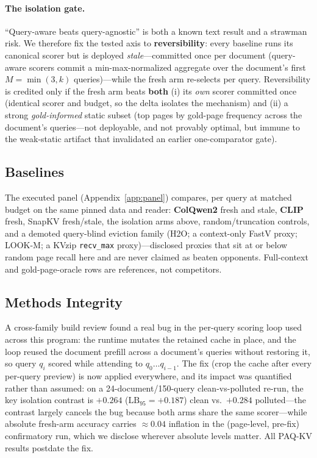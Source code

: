 \documentclass[letterpaper]{article} %
\newcommand{\paqc}{\textsc{PAQ-KV}}
\newcommand{\lb}{\mathrm{LB}_{95}}
\begin{document}
\paragraph{The isolation gate.} ``Query-aware beats query-agnostic'' is both a known text result \citep{tang2024quest} and a strawman risk. We therefore fix the tested axis to \textbf{reversibility}: every baseline runs its canonical scorer but is deployed \emph{stale}---committed once per document (query-aware scorers commit a min-max-normalized aggregate over the document's first $M=\min(3,k)$ queries)---while the fresh arm re-selects per query. Reversibility is credited only if the fresh arm beats \textbf{both} (i) its \emph{own} scorer committed once (identical scorer and budget, so the delta isolates the mechanism) and (ii) a strong \emph{gold-informed} static subset (top pages by gold-page frequency across the document's queries---not deployable, and not provably optimal, but immune to the weak-static artifact that invalidated an earlier one-comparator gate).

\subsection{Baselines}
The executed panel (Appendix~\ref{app:panel}) compares, per query at matched budget on the same pinned data and reader: \textbf{ColQwen2} \citep{faysse2025colpali} fresh and stale, \textbf{CLIP} \citep{radford2021clip} fresh, SnapKV fresh/stale, the isolation arms above, random/truncation controls, and a demoted query-blind eviction family (H2O; a context-only FastV proxy; LOOK-M; a KVzip \texttt{recv\_max} proxy)---disclosed proxies that sit at or below random page recall here and are never claimed as beaten opponents. Full-context and gold-page-oracle rows are references, not competitors.

\subsection{Methods Integrity}\label{sec:integrity}
A cross-family build review found a real bug in the per-query scoring loop used across this program: the runtime mutates the retained cache in place, and the loop reused the document prefill across a document's queries without restoring it, so query $q_i$ scored while attending to $q_0\ldots q_{i-1}$. The fix (crop the cache after every per-query preview) is now applied everywhere, and its impact was quantified rather than assumed: on a 24-document/150-query clean-vs-polluted re-run, the key isolation contrast is $+0.264$ ($\lb=+0.187$) clean vs.\ $+0.284$ polluted---the contrast largely cancels the bug because both arms share the same scorer---while absolute fresh-arm accuracy carries ${\approx}0.04$ inflation in the (page-level, pre-fix) confirmatory run, which we disclose wherever absolute levels matter. All \paqc{} results postdate the fix.
\end{document}
